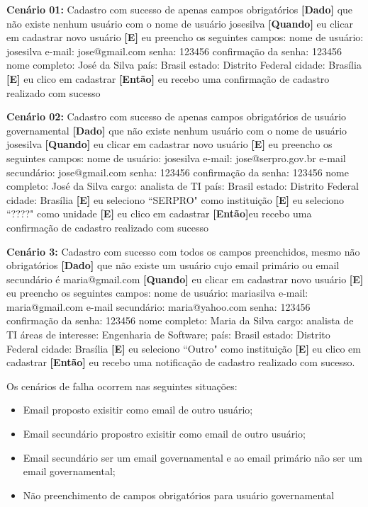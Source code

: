 	\textbf{Cenário 01:} Cadastro com sucesso de apenas campos obrigatórios
	\textbf{[Dado]} que não existe nenhum usuário com o nome de usuário josesilva 
	\textbf{[Quando]} eu clicar em cadastrar novo usuário
	\textbf{[E]} eu preencho os seguintes campos: 
  		nome de usuário: josesilva
  		e-mail: jose@gmail.com
  		senha: 123456
  		confirmação da senha: 123456
  		nome completo: José da Silva 
  		país: Brasil
  		estado: Distrito Federal
  		cidade: Brasília
	\textbf{[E]} eu clico em cadastrar
	\textbf{[Então]} eu recebo uma confirmação de cadastro realizado com sucesso

	\textbf{Cenário 02:} Cadastro com sucesso de apenas campos obrigatórios de usuário governamental
	\textbf{[Dado]} que não existe nenhum usuário com o nome de usuário josesilva 
	\textbf{[Quando]} eu clicar em cadastrar novo usuário
	\textbf{[E]} eu preencho os seguintes campos: 
  		nome de usuário: josesilva
  		e-mail: jose@serpro.gov.br
  		e-mail secundário: jose@gmail.com
  		senha: 123456
		  confirmação da senha: 123456
		  nome completo: José da Silva 
		  cargo: analista de TI
		  país: Brasil
		  estado: Distrito Federal
		  cidade: Brasília
	\textbf{[E]} eu seleciono ``SERPRO" como instituição
	\textbf{[E]} eu seleciono ``????" como unidade  
	\textbf{[E]} eu clico em cadastrar
	\textbf{[Então]}eu recebo uma confirmação de cadastro realizado com sucesso

\textbf{Cenário 3:} Cadastro com sucesso com todos os campos preenchidos, mesmo não obrigatórios
	\textbf{[Dado]} que não existe um usuário cujo email primário ou email secundário é maria@gmail.com
	\textbf{[Quando]} eu clicar em cadastrar novo usuário
	\textbf{[E]} eu preencho os seguintes campos: 
  		nome de usuário: mariasilva
		  e-mail: maria@gmail.com
		  e-mail secundário: maria@yahoo.com
		  senha: 123456
		  confirmação da senha: 123456
		  nome completo: Maria da Silva
		  cargo: analista de TI
		  áreas de interesse: Engenharia de Software;
		  país: Brasil
		  estado: Distrito Federal
		  cidade: Brasília
	\textbf{[E]} eu seleciono ``Outro" como instituição 
	\textbf{[E]} eu clico em cadastrar
	\textbf{[Então]} eu recebo uma notificação de cadastro realizado com sucesso.

	Os cenários de falha ocorrem nas seguintes situações:
	\begin{itemize}
	\item Email proposto exisitir como email de outro usuário;
	\item Email secundário propostro exisitir como email de outro usuário;
	\item Email secundário ser um email governamental e ao email primário não ser um email governamental;
	\item Não preenchimento de campos obrigatórios para usuário governamental 
	\end{itemize}



